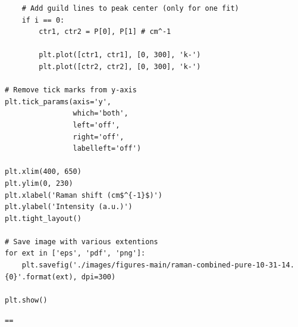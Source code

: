 \documentclass[journal=jpccck,manuscript=suppinfo,email=true]{achemso}
\begin{document}
\begin{verbatim}
    # Add guild lines to peak center (only for one fit)
    if i == 0:
        ctr1, ctr2 = P[0], P[1] # cm^-1

        plt.plot([ctr1, ctr1], [0, 300], 'k-')
        plt.plot([ctr2, ctr2], [0, 300], 'k-')

# Remove tick marks from y-axis
plt.tick_params(axis='y',
                which='both',
                left='off',
                right='off',
                labelleft='off')

plt.xlim(400, 650)
plt.ylim(0, 230)
plt.xlabel('Raman shift (cm$^{-1}$)')
plt.ylabel('Intensity (a.u.)')
plt.tight_layout()

# Save image with various extentions
for ext in ['eps', 'pdf', 'png']:
    plt.savefig('./images/figures-main/raman-combined-pure-10-31-14.{0}'.format(ext), dpi=300)

plt.show()
\end{verbatim}

\texttt{==}
\end{document}
